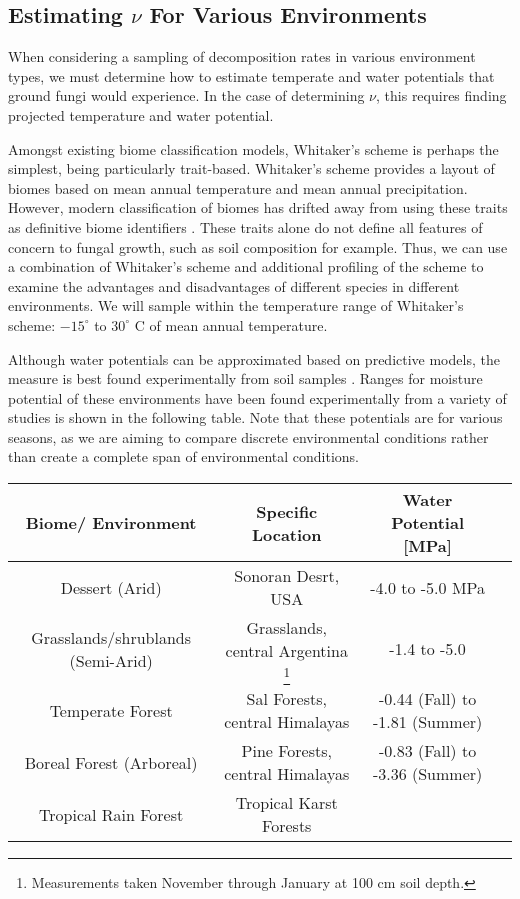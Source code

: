 \documentclass{article}
\begin{document}
\subsection{Estimating $\nu$ For Various Environments}

When considering a sampling of decomposition rates in various environment types, we must determine how to estimate temperate and water potentials that ground fungi would experience. In the case of determining $\nu$, this requires finding projected temperature and water potential.

Amongst existing biome classification models, Whitaker's scheme \cite{whittaker1970} is perhaps the simplest, being particularly trait-based. Whitaker's scheme provides a layout of biomes based on mean annual temperature and mean annual precipitation. However, modern classification of biomes has drifted away from using these traits as definitive biome identifiers \cite{mucina2018}. These traits alone do not define all features of concern to fungal growth, such as soil composition for example. Thus, we can use a combination of Whitaker's scheme and additional profiling of the scheme to examine the advantages and disadvantages of different species in different environments. We will sample within the temperature range of Whitaker's scheme: $-15^{\circ}$ to $30^{\circ}$ C of mean annual temperature.

 Although water potentials can be approximated based on predictive models, the measure is best found experimentally from soil samples \cite{Abkenar2019}. Ranges for moisture potential of these environments have been found experimentally from a variety of studies is shown in the following table. Note that these potentials are for various seasons, as we are aiming to compare discrete environmental conditions rather than create a complete span of environmental conditions.

\begin{savenotes}
\begin{table}[ht]
\begin{center}
 \begin{tabular}{|c c c c|} 
 \hline
 Biome/ Environment & Specific Location & Water Potential [MPa] \\ [0.5ex] 
 \hline\hline
 Dessert (Arid) & Sonoran Desrt, USA & -4.0 to -5.0 MPa \cite{Nilsen1983} \\ 
 \hline
 Grasslands/shrublands (Semi-Arid) & Grasslands, central Argentina \footnote{Measurements taken November through January at 100 cm soil depth.} & -1.4 to -5.0 \cite{Pelaez 1994}\\
 \hline
 Temperate Forest & Sal Forests, central Himalayas & -0.44 (Fall) to -1.81 (Summer) \cite{Zobel2001} \\
 \hline
 Boreal Forest (Arboreal) & Pine Forests, central Himalayas & -0.83 (Fall) to -3.36 (Summer) \cite{Zobel2001}\\
 \hline
 Tropical Rain Forest & Tropical Karst Forests &  \\ [1ex] 
 \hline
\end{tabular}
\end{center}
\end{table}
\end{savenotes}
\end{document}
